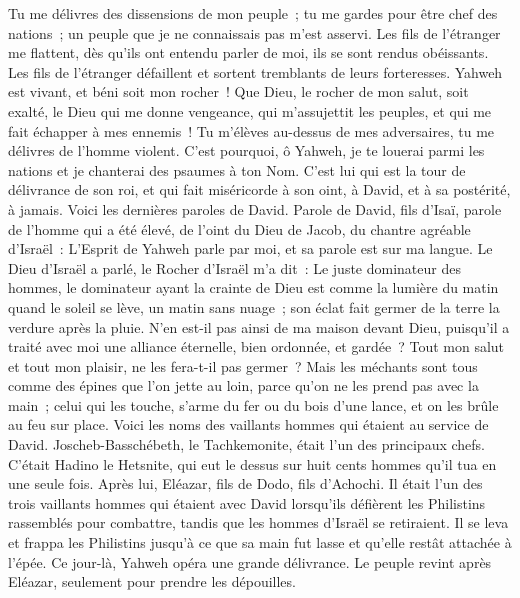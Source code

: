 \begin{multicols}{2}
Tu me délivres des dissensions de mon peuple~; tu me gardes pour être chef des nations~; un peuple que je ne connaissais pas m'est asservi.
Les fils de l'étranger me flattent, dès qu'ils ont entendu parler de moi, ils se sont rendus obéissants.
Les fils de l'étranger défaillent et sortent tremblants de leurs forteresses.
Yahweh est vivant, et béni soit mon rocher~! Que Dieu, le rocher de mon salut, soit exalté,
le Dieu qui me donne vengeance, qui m'assujettit les peuples,
et qui me fait échapper à mes ennemis~! Tu m'élèves au-dessus de mes adversaires, tu me délivres de l'homme violent.
C'est pourquoi, ô Yahweh, je te louerai parmi les nations et je chanterai des psaumes à ton Nom.
C'est lui qui est la tour de délivrance de son roi, et qui fait miséricorde à son oint, à David, et à sa postérité, à jamais.
\VerseOne{}Voici les dernières paroles de David. Parole de David, fils d'Isaï, parole de l'homme qui a été élevé, de l'oint du Dieu de Jacob, du chantre agréable d'Israël~:
L'Esprit de Yahweh parle par moi, et sa parole est sur ma langue.
Le Dieu d'Israël a parlé, le Rocher d'Israël m'a dit~: Le juste dominateur des hommes, le dominateur ayant la crainte de Dieu
est comme la lumière du matin quand le soleil se lève, un matin sans nuage~; son éclat fait germer de la terre la verdure après la pluie.
N'en est-il pas ainsi de ma maison devant Dieu, puisqu'il a traité avec moi une alliance éternelle, bien ordonnée, et gardée~? Tout mon salut et tout mon plaisir, ne les fera-t-il pas germer~?
Mais les méchants sont tous comme des épines que l'on jette au loin, parce qu'on ne les prend pas avec la main~;
celui qui les touche, s'arme du fer ou du bois d'une lance, et on les brûle au feu sur place.
Voici les noms des vaillants hommes qui étaient au service de David. Joscheb-Basschébeth, le Tachkemonite, était l'un des principaux chefs. C'était Hadino le Hetsnite, qui eut le dessus sur huit cents hommes qu'il tua en une seule fois.
Après lui, Eléazar, fils de Dodo, fils d'Achochi. Il était l'un des trois vaillants hommes qui étaient avec David lorsqu'ils défièrent les Philistins rassemblés pour combattre, tandis que les hommes d'Israël se retiraient.
Il se leva et frappa les Philistins jusqu'à ce que sa main fut lasse et qu'elle restât attachée à l'épée. Ce jour-là, Yahweh opéra une grande délivrance. Le peuple revint après Eléazar, seulement pour prendre les dépouilles.

\end{multicols}
